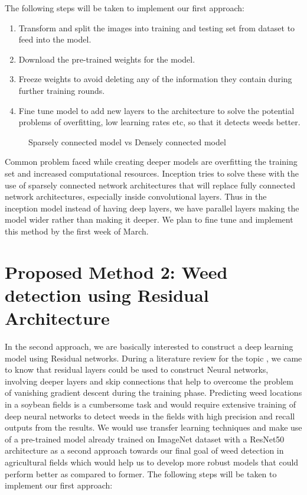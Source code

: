 \documentclass{report}
\begin{document}
The following steps will be taken to implement our first approach:
\begin{enumerate}
	\item Transform and split the images into training and testing set  from dataset to feed into the model. 
	\item Download the pre-trained weights for the model.
	\item Freeze weights to avoid deleting any of the information they contain during further training rounds.  
	\item Fine tune model to add new layers to the architecture to solve the potential problems of overfitting, low learning rates etc, so that it detects weeds better.

\end{enumerate}
\begin{figure}[h]
    \centering
    \qquad
    \caption{Sparsely connected model vs Densely connected model}%
    \label{fig:Arch1_Tr3}%
\end{figure}

Common problem faced while creating deeper models are overfitting the training set and increased computational resources. Inception tries to solve these with the use of sparsely connected network architectures that will replace fully connected network architectures, especially inside convolutional layers. Thus in the inception model instead of having deep layers, we have parallel layers making the model wider rather than making it deeper. We plan to fine tune and implement this method by the first week of March.


\section{Proposed Method 2: Weed detection using Residual Architecture}

In the second approach, we are basically interested to construct a deep learning model using Residual networks. During a literature review for the topic \cite{ResNetArchi}, we came to know that residual layers could be used to construct Neural networks, involving deeper layers and skip connections that help to overcome the problem of vanishing gradient descent during the training phase. Predicting weed locations in a soybean fields is a cumbersome task and would require extensive training of deep neural networks to detect weeds in the fields with high precision and recall outputs from the results. We would use transfer learning techniques and make use of a pre-trained model already trained on ImageNet dataset with a ResNet50 architecture as a second approach towards our final goal of weed detection in agricultural fields which would help us to develop more robust models that could perform better as compared to former. The following steps will be taken to implement our first approach:
\end{document}
